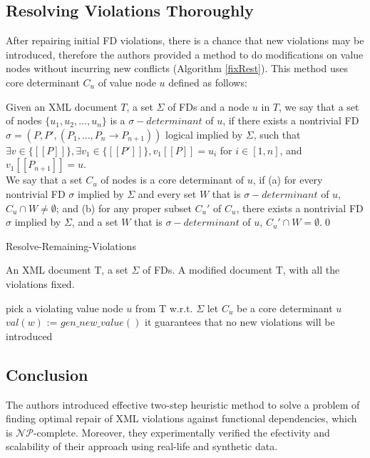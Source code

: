 \subsection{Resolving Violations Thoroughly}

After repairing initial FD violations, there is a chance that new violations may be introduced, therefore the authors provided a method to do modifications on value nodes without incurring new conflicts (Algorithm \ref{fixRest}). This method uses core determinant $C_u$ of value node $u$ defined as follows:

\begin{define}
Given an XML document $T$, a set $\Sigma$ of FDs and a node $u$ in $T$, we say that a set of nodes $\{u_1, u_2, \dots, u_n\}$ is a $\sigma\!-\!determinant$ of $u$, if there exists a nontrivial FD $\sigma = (P, P', (P_1, \dots, P_n \rightarrow P_{n+1}))$ logical implied by $\Sigma$, such that $\exists v \in \{[\![P]\!]\}, \exists v_1 \in \{[\![P']\!]\}, v_1[\![P]\!] = u_i$ for $i \in [1,n]$, and $v_1[\![P_{n+1}]\!] = u$.\\
We say that a set $C_u$ of nodes is a core determinant of $u$, if (a) for every nontrivial FD $\sigma$ implied by $\Sigma$ and every set $W$ that is $\sigma\!-\!determinant$ of $u$, $C_u \cap W \neq \emptyset$; and (b) for any proper subset $C_u'$ of $C_u$, there exists a nontrivial FD $\sigma$ implied by $\Sigma$, and a set $W$ that is $\sigma\!-\!determinant$ of $u$, $C_u' \cap W = \emptyset$.\qed
\end{define}

\begin{algorithm}[H]
\caption{Resolve-Remaining-Violations}
\label{fixRest}
\begin{algorithmic}[1]
\REQUIRE An XML document T, a set $\Sigma$ of FDs.
\ENSURE A modified document T, with all the violations fixed.

\STATE pick a violating value node $u$ from T w.r.t. $\Sigma$
\STATE let $C_u$ be a core determinant $u$
\STATE $val(w)$ := $gen\_new\_value()$
\STATE \COMMENT it guarantees that no new violations will be introduced
\ENDFOR
\ENDWHILE
\end{algorithmic}
\end{algorithm}

\subsection{Conclusion}

The authors introduced effective two-step heuristic method to solve a problem of finding optimal repair of XML violations against functional dependencies, which is $\mathcal{NP}$-complete. Moreover, they experimentally verified the efectivity and scalability of their approach using real-life and synthetic data.
